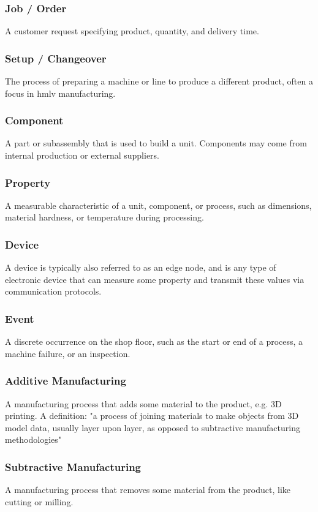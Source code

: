 \subsubsection{Job / Order}
A customer request specifying product, quantity, and delivery time.

\subsubsection{Setup / Changeover}
The process of preparing a machine or line to produce a different product, often a focus in \ac{hmlv} manufacturing.

\subsubsection{Component}
A part or subassembly that is used to build a unit.
Components may come from internal production or external suppliers.

\subsubsection{Property}
A measurable characteristic of a unit, component, or process, such as dimensions, material hardness, or temperature during processing.

\subsubsection{Device}
A device is typically also referred to as an edge node, and is any type of electronic device that can measure some property and transmit these values via communication protocols.

\subsubsection{Event}
A discrete occurrence on the shop floor, such as the start or end of a process, a machine failure, or an inspection.

\subsubsection{Additive Manufacturing}
A manufacturing process that adds some material to the product, e.g. 3D printing.
A definition: "a process of joining materials to make objects from 3D model data, usually layer upon layer, as opposed to subtractive manufacturing methodologies"

\subsubsection{Subtractive Manufacturing}
A manufacturing process that removes some material from the product, like cutting or milling. 
